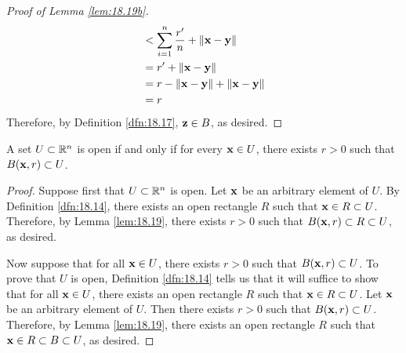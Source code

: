 \documentclass[../main.tex]{subfiles}
\begin{document}
\begin{lemma}
\begin{enumerate}[label={\textup{(}\alph*\textup{)}},ref={\thelemma\alph*}]
\begin{proof}[Proof of Lemma \ref{lem:18.19b}]
\begin{align*}
                &< \sum_{i=1}^n\frac{r'}{n}+\norm{\mathbf{x}-\mathbf{y}}\\
                &= r'+\norm{\mathbf{x}-\mathbf{y}}\\
                &= r-\norm{\mathbf{x}-\mathbf{y}}+\norm{\mathbf{x}-\mathbf{y}}\\
                &= r
            \end{align*}
            Therefore, by Definition \ref{dfn:18.17}, $\mathbf{z}\in B$, as desired.
        \end{proof}
    \end{enumerate}
\end{lemma}

\begin{corollary}\label{cly:18.20}
    A set $U\subset\mathbb{R}^n$ is open if and only if for every $\mathbf{x}\in U$, there exists $r>0$ such that $B(\mathbf{x},r)\subset U$.
    \begin{proof}
        Suppose first that $U\subset\mathbb{R}^n$ is open. Let $\mathbf{x}$ be an arbitrary element of $U$. By Definition \ref{dfn:18.14}, there exists an open rectangle $R$ such that $\mathbf{x}\in R\subset U$. Therefore, by Lemma \ref{lem:18.19}, there exists $r>0$ such that $B(\mathbf{x},r)\subset R\subset U$, as desired.\par
        Now suppose that for all $\mathbf{x}\in U$, there exists $r>0$ such that $B(\mathbf{x},r)\subset U$. To prove that $U$ is open, Definition \ref{dfn:18.14} tells us that it will suffice to show that for all $\mathbf{x}\in U$, there exists an open rectangle $R$ such that $\mathbf{x}\in R\subset U$. Let $\mathbf{x}$ be an arbitrary element of $U$. Then there exists $r>0$ such that $B(\mathbf{x},r)\subset U$. Therefore, by Lemma \ref{lem:18.19}, there exists an open rectangle $R$ such that $\mathbf{x}\in R\subset B\subset U$, as desired.
    \end{proof}
\end{corollary}
\end{document}
